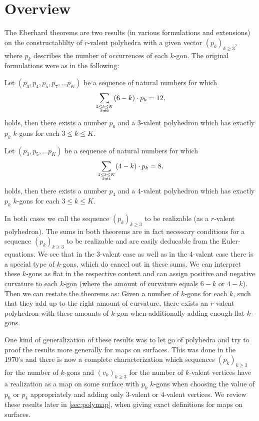 \section{Overview}

The {\sc Eberhard} theorems are two results (in various formulations and extensions) on the constructablilty of $r$-valent polyhedra with a given vector $(p_k)_{k \geq 3}$, where $p_k$ describes the number of occurrences of each $k$-gon. The original formulations were as in the following:
\begin{theorem}\label{thm:eberhard:3} Let $(p_3, p_4, p_5, p_7, \dots p_K)$ be a sequence of natural numbers for which
\begin{align*}
  \sum_{3 \leq k \leq K \atop k \neq 6}(6 - k) \cdot p_k = 12,
\end{align*}
holds, then there exists a number $p_6$ and a $3$-valent polyhedron which has exactly $p_k$ $k$-gons for each $3 \leq k \leq K$.
\end{theorem}
\begin{theorem}\label{thm:eberhard:4} Let $(p_3,  p_5, \dots p_K)$ be a sequence of natural numbers for which
\begin{align*}
  \sum_{3 \leq k \leq K \atop k \neq 4}(4 - k) \cdot p_k = 8,
\end{align*}
holds, then there exists a number $p_4$ and a $4$-valent polyhedron which has exactly $p_k$ $k$-gons for each $3 \leq k \leq K$.
\end{theorem}

In both cases we call the sequence $(p_k)_{k \geq 3}$ to be realizable (as a $r$-valent polyhedron). The sums in both theorems are in fact necessary conditions for a sequence $(p_k)_{k \geq 3}$ to be realizable and are easily deducable from the {\sc Euler}-equations. We see that in the $3$-valent case as well as in the $4$-valent case there is a special type of $k$-gons, which do cancel out in these sums. We can interpret these $k$-gons as flat in the respective context and can assign positive and negative curvature to each $k$-gon (where the amount of curvature equals $6 - k$ or $4 - k$). Then we can restate the theorems as: Given a number of $k$-gons for each $k$, such that they add up to the right amount of curvature, there exists an $r$-valent polyhedron with these amounts of $k$-gon when additionally adding enough flat $k$-gons.

One kind of generalization of these results was to let go of polyhedra and try to proof the results more generally for maps on surfaces. This was done in the 1970's and there is now a complete characterization which sequences $(p_k)_{k\geq 3}$ for the number of $k$-gons and $(v_k)_{k \geq 3}$ for the number of $k$-valent vertices have a realization as a map on some surface with $p_k$ $k$-gons when choosing the value of $p_6$ or $p_4$ appropriately and adding only $3$-valent or $4$-valent vertices. We review these results later in \autoref{sec:polymap}, when giving exact definitions for maps on surfaces.

